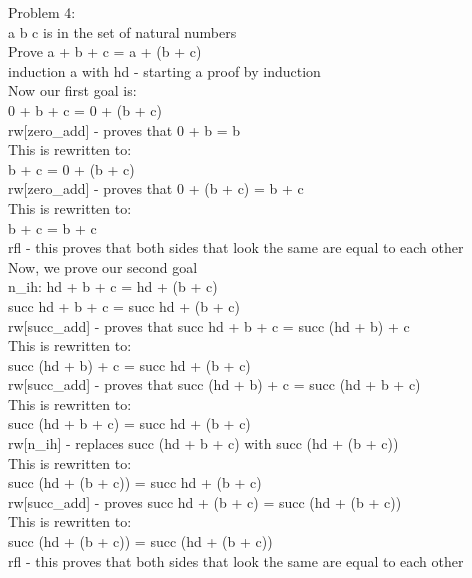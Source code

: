 \documentclass{article}
\theoremstyle{theorem}
\theoremstyle{definition}
\theoremstyle{remark}
\begin{document}
Problem 4:\\
a b c is in the set of natural numbers\\
Prove a + b + c = a + (b + c)\\
induction a with hd - starting a proof by induction\\
Now our first goal is:\\
0 + b + c = 0 + (b + c)\\
rw[zero\_add] - proves that 0 + b = b\\
This is rewritten to:\\
b + c = 0 + (b + c)\\
rw[zero\_add] - proves that 0 + (b + c) = b + c\\
This is rewritten to:\\
b + c = b + c\\
rfl - this proves that both sides that look the same are equal to each other \\
Now, we prove our second goal\\
n\_ih: hd + b + c = hd + (b + c)\\
succ hd + b + c = succ hd + (b + c)\\
rw[succ\_add] - proves that succ hd + b + c = succ (hd + b) + c\\
This is rewritten to:\\
succ (hd + b) + c = succ hd + (b + c)\\
rw[succ\_add] - proves that succ (hd + b) + c = succ (hd + b + c)\\
This is rewritten to:\\
succ (hd + b + c) = succ hd + (b + c)\\
rw[n\_ih] - replaces succ (hd + b + c) with succ (hd + (b + c))\\
This is rewritten to:\\
succ (hd + (b + c)) = succ hd + (b + c)\\
rw[succ\_add] - proves succ hd + (b + c) = succ (hd + (b + c))\\
This is rewritten to:\\
succ (hd + (b + c)) = succ (hd + (b + c))\\
rfl - this proves that both sides that look the same are equal to each other \\
\end{document}
